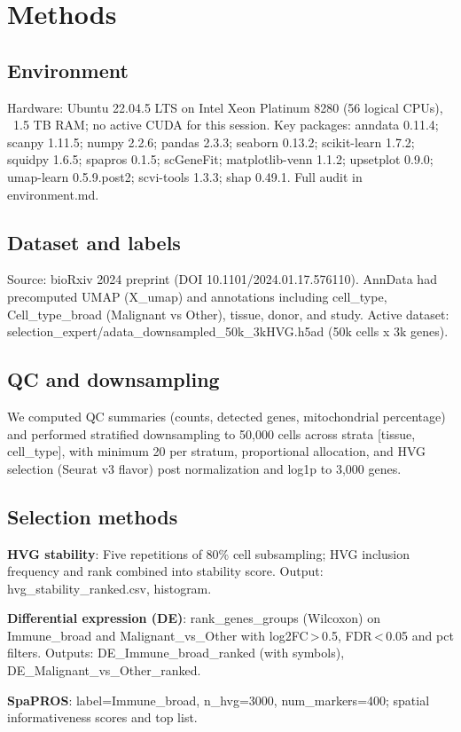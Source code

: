 \documentclass[11pt]{article}
\begin{document}
\section{Methods}
\subsection{Environment}
Hardware: Ubuntu 22.04.5 LTS on Intel Xeon Platinum 8280 (56 logical CPUs), ~1.5 TB RAM; no active CUDA for this session. Key packages: anndata 0.11.4; scanpy 1.11.5; numpy 2.2.6; pandas 2.3.3; seaborn 0.13.2; scikit-learn 1.7.2; squidpy 1.6.5; spapros 0.1.5; scGeneFit; matplotlib-venn 1.1.2; upsetplot 0.9.0; umap-learn 0.5.9.post2; scvi-tools 1.3.3; shap 0.49.1. Full audit in environment.md.

\subsection{Dataset and labels}
Source: bioRxiv 2024 preprint (DOI 10.1101/2024.01.17.576110). AnnData had precomputed UMAP (X\_umap) and annotations including cell\_type, Cell\_type\_broad (Malignant vs Other), tissue, donor, and study. Active dataset: selection\_expert/adata\_downsampled\_50k\_3kHVG.h5ad (50k cells x 3k genes).

\subsection{QC and downsampling}
We computed QC summaries (counts, detected genes, mitochondrial percentage) and performed stratified downsampling to 50{,}000 cells across strata [tissue, cell\_type], with minimum 20 per stratum, proportional allocation, and HVG selection (Seurat v3 flavor) post normalization and log1p to 3{,}000 genes.

\subsection{Selection methods}
\textbf{HVG stability}: Five repetitions of 80\% cell subsampling; HVG inclusion frequency and rank combined into stability score. Output: hvg\_stability\_ranked.csv, histogram.

\textbf{Differential expression (DE)}: rank\_genes\_groups (Wilcoxon) on Immune\_broad and Malignant\_vs\_Other with log2FC\,>\,0.5, FDR\,<\,0.05 and pct filters. Outputs: DE\_Immune\_broad\_ranked (with symbols), DE\_Malignant\_vs\_Other\_ranked.

\textbf{SpaPROS}: label=Immune\_broad, n\_hvg=3000, num\_markers=400; spatial informativeness scores and top list.
\end{document}
